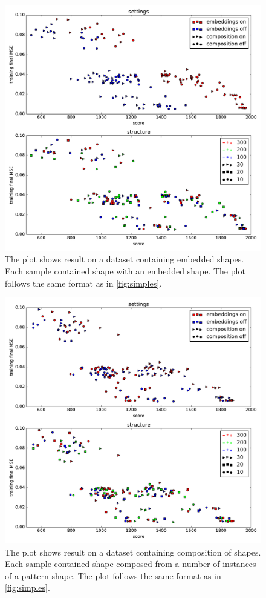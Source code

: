 \begin{figure}
\centering
\includegraphics[width=\linewidth]{ext/figure_embed_cmb.pdf}
\caption{The plot shows result on a dataset containing embedded shapes. Each sample  contained shape with an embedded shape. The plot follows the same format as in \cref{fig:simples}.}
\label{fig:embed}
\end{figure}

\begin{figure}
\centering
\includegraphics[width=\linewidth]{ext/figure_comp_cmb.pdf}
\caption{The plot shows result on a dataset containing composition of shapes. Each sample  contained shape composed from a number of instances of a pattern shape. The plot follows the same format as in \cref{fig:simples}.}
\label{fig:comp}
\end{figure}

